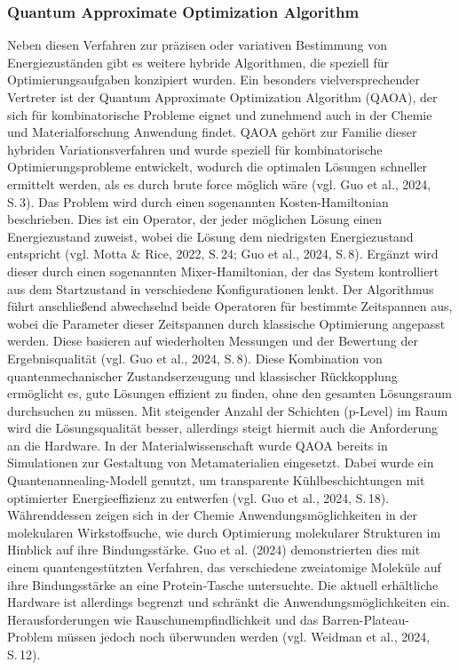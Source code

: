\subsubsection*{Quantum Approximate Optimization Algorithm}
Neben diesen Verfahren zur präzisen oder variativen Bestimmung von Energiezuständen gibt es weitere hybride Algorithmen, die speziell für Optimierungsaufgaben konzipiert wurden. Ein besonders vielversprechender Vertreter ist der Quantum Approximate Optimization Algorithm (QAOA), der sich für kombinatorische Probleme eignet und zunehmend auch in der Chemie und Materialforschung Anwendung findet.
QAOA gehört zur Familie dieser hybriden Variationsverfahren und wurde speziell für kombinatorische Optimierungsprobleme entwickelt, wodurch die optimalen Lösungen schneller ermittelt werden, als es durch brute force möglich wäre (vgl. Guo et al., 2024, S. 3). Das Problem wird durch einen sogenannten Kosten-Hamiltonian beschrieben. Dies ist ein Operator, der jeder möglichen Lösung einen Energiezustand zuweist, wobei die Lösung dem niedrigsten Energiezustand entspricht (vgl. Motta & Rice, 2022, S. 24; Guo et al., 2024, S. 8). Ergänzt wird dieser durch einen sogenannten Mixer-Hamiltonian, der das System kontrolliert aus dem Startzustand in verschiedene Konfigurationen lenkt. Der Algorithmus führt anschließend abwechselnd beide Operatoren für bestimmte Zeitspannen aus, wobei die Parameter dieser Zeitspannen durch klassische Optimierung angepasst werden. Diese basieren auf wiederholten Messungen und der Bewertung der Ergebnisqualität (vgl. Guo et al., 2024, S. 8).
Diese Kombination von quantenmechanischer Zustandserzeugung und klassischer Rückkopplung ermöglicht es, gute Lösungen effizient zu finden, ohne den gesamten Lösungsraum durchsuchen zu müssen. Mit steigender Anzahl der Schichten (p-Level) im Raum wird die Lösungsqualität besser, allerdings steigt hiermit auch die Anforderung an die Hardware.
In der Materialwissenschaft wurde QAOA bereits in Simulationen zur Gestaltung von Metamaterialien eingesetzt. Dabei wurde ein Quantenannealing-Modell genutzt, um transparente Kühlbeschichtungen mit optimierter Energieeffizienz zu entwerfen (vgl. Guo et al., 2024, S. 18). Währenddessen zeigen sich in der Chemie Anwendungsmöglichkeiten in der molekularen Wirkstoffsuche, wie durch Optimierung molekularer Strukturen im Hinblick auf ihre Bindungsstärke. Guo et al. (2024) demonstrierten dies mit einem quantengestützten Verfahren, das verschiedene zweiatomige Moleküle auf ihre Bindungsstärke an eine Protein-Tasche untersuchte. Die aktuell erhältliche Hardware ist allerdings begrenzt und schränkt die Anwendungsmöglichkeiten ein. Herausforderungen wie Rauschunempfindlichkeit und das Barren-Plateau-Problem müssen jedoch noch überwunden werden (vgl. Weidman et al., 2024, S. 12).


